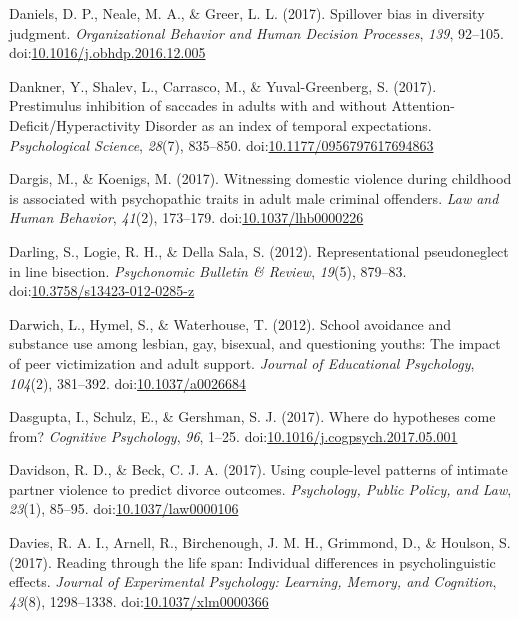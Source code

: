 \documentclass[english,man]{apa6}
\theoremstyle{definition}
\theoremstyle{definition}
\theoremstyle{definition}
\theoremstyle{remark}
\begin{document}
\hypertarget{ref-Daniels2017}{}
Daniels, D. P., Neale, M. A., \& Greer, L. L. (2017). Spillover bias in
diversity judgment. \emph{Organizational Behavior and Human Decision
Processes}, \emph{139}, 92--105.
doi:\href{https://doi.org/10.1016/j.obhdp.2016.12.005}{10.1016/j.obhdp.2016.12.005}

\hypertarget{ref-Dankner2017}{}
Dankner, Y., Shalev, L., Carrasco, M., \& Yuval-Greenberg, S. (2017).
Prestimulus inhibition of saccades in adults with and without
Attention-Deficit/Hyperactivity Disorder as an index of temporal
expectations. \emph{Psychological Science}, \emph{28}(7), 835--850.
doi:\href{https://doi.org/10.1177/0956797617694863}{10.1177/0956797617694863}

\hypertarget{ref-Dargis2017}{}
Dargis, M., \& Koenigs, M. (2017). Witnessing domestic violence during
childhood is associated with psychopathic traits in adult male criminal
offenders. \emph{Law and Human Behavior}, \emph{41}(2), 173--179.
doi:\href{https://doi.org/10.1037/lhb0000226}{10.1037/lhb0000226}

\hypertarget{ref-Darling2012}{}
Darling, S., Logie, R. H., \& Della Sala, S. (2012). Representational
pseudoneglect in line bisection. \emph{Psychonomic Bulletin \& Review},
\emph{19}(5), 879--83.
doi:\href{https://doi.org/10.3758/s13423-012-0285-z}{10.3758/s13423-012-0285-z}

\hypertarget{ref-Darwich2012}{}
Darwich, L., Hymel, S., \& Waterhouse, T. (2012). School avoidance and
substance use among lesbian, gay, bisexual, and questioning youths: The
impact of peer victimization and adult support. \emph{Journal of
Educational Psychology}, \emph{104}(2), 381--392.
doi:\href{https://doi.org/10.1037/a0026684}{10.1037/a0026684}

\hypertarget{ref-Dasgupta2017}{}
Dasgupta, I., Schulz, E., \& Gershman, S. J. (2017). Where do hypotheses
come from? \emph{Cognitive Psychology}, \emph{96}, 1--25.
doi:\href{https://doi.org/10.1016/j.cogpsych.2017.05.001}{10.1016/j.cogpsych.2017.05.001}

\hypertarget{ref-Davidson2017}{}
Davidson, R. D., \& Beck, C. J. A. (2017). Using couple-level patterns
of intimate partner violence to predict divorce outcomes.
\emph{Psychology, Public Policy, and Law}, \emph{23}(1), 85--95.
doi:\href{https://doi.org/10.1037/law0000106}{10.1037/law0000106}

\hypertarget{ref-Davies2017}{}
Davies, R. A. I., Arnell, R., Birchenough, J. M. H., Grimmond, D., \&
Houlson, S. (2017). Reading through the life span: Individual
differences in psycholinguistic effects. \emph{Journal of Experimental
Psychology: Learning, Memory, and Cognition}, \emph{43}(8), 1298--1338.
doi:\href{https://doi.org/10.1037/xlm0000366}{10.1037/xlm0000366}
\end{document}
